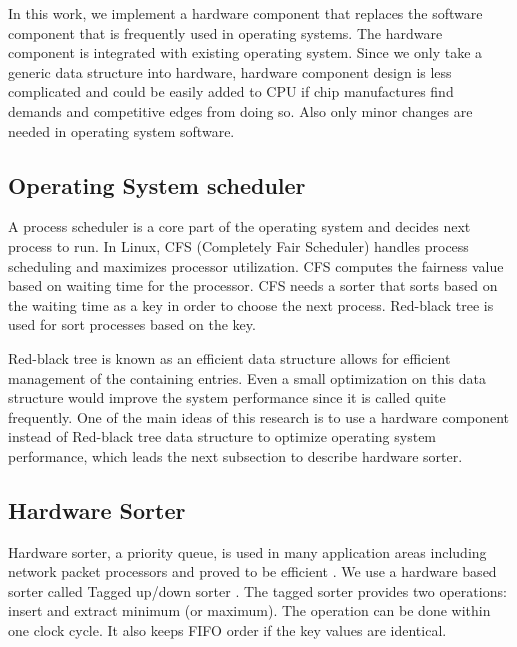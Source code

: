 \documentclass[10pt,a4paper]{article}
\begin{document}
\begin{multicols}{2}
In this work, we implement a hardware component that replaces the software component that is frequently used in operating systems. The hardware component is integrated with existing operating system. Since we only take a generic data structure into hardware, hardware component design is less complicated and could be easily added to CPU if chip manufactures find demands and competitive edges from doing so. Also only minor changes are needed in operating system software.



\subsection{Operating System scheduler}

A process scheduler is a core part of the operating system and decides next process to run. In Linux, CFS (Completely Fair Scheduler) handles process scheduling and maximizes processor utilization. CFS computes the fairness value based on waiting time for the processor. CFS needs a sorter that sorts based on the waiting time as a key in order to choose the next process. Red-black tree is used for sort processes based on the key.

Red-black tree is known as an efficient data structure allows for efficient management of the containing entries. Even a small optimization on this data structure would improve the system performance since it is called quite frequently. One of the main ideas of this research is to use a hardware component instead of Red-black tree data structure to optimize operating system performance, which leads the next subsection to describe hardware sorter.


\subsection{Hardware Sorter}

Hardware sorter, a priority queue, is used in many application areas including network packet processors and proved to be efficient \cite{tagged,tagged_routers,mq,moon}. We use a hardware based sorter called Tagged up/down sorter \cite{tagged}. The tagged sorter provides two operations: insert and extract minimum (or maximum). The operation can be done within one clock cycle. It also keeps FIFO order if the key values are identical.


\end{multicols}
\end{document}
